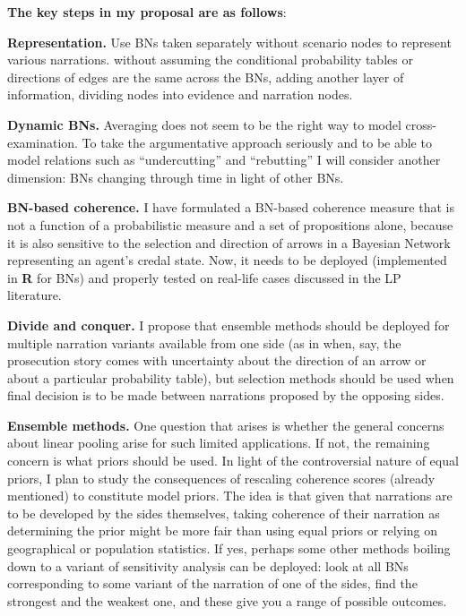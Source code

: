\documentclass[11pt,dvipsnames,enabledeprecatedfontcommands]{scrartcl}
\begin{document}
\vspace{2mm}

\noindent \textbf{The key steps in my proposal are as follows}:

\vspace{1mm}

\noindent
\textbf{Representation.} Use BNs taken separately without scenario nodes
to represent various narrations. without assuming the conditional
probability tables or directions of edges are the same across the BNs,
adding another layer of information, dividing nodes into evidence and
narration nodes.

\noindent \textbf{Dynamic BNs.} Averaging does not seem to be the right
way to model cross-examination. To take the argumentative approach
seriously and to be able to model relations such as ``undercutting'' and
``rebutting'' I will consider another dimension: BNs changing through
time in light of other BNs.

\noindent
 \textbf{BN-based coherence.} I have formulated a BN-based coherence
measure that is not a function of a probabilistic measure and a set of
propositions alone, because it is also sensitive to the selection and
direction of arrows in a Bayesian Network representing an agent's credal
state. Now, it needs to be deployed (implemented in \textbf{\textsf{R}}
for BNs) and properly tested on real-life cases discussed in the LP
literature.

\noindent
 \textbf{Divide and conquer.} I propose that ensemble methods should be
deployed for multiple narration variants available from one side (as in
when, say, the prosecution story comes with uncertainty about the
direction of an arrow or about a particular probability table), but
selection methods should be used when final decision is to be made
between narrations proposed by the opposing sides.

\noindent
\textbf{Ensemble methods.} One question that arises is whether the
general concerns about linear pooling arise for such limited
applications. If not, the remaining concern is what priors should be
used. In light of the controversial nature of equal priors, I plan to
study the consequences of rescaling coherence scores (already mentioned)
to constitute model priors. The idea is that given that narrations are
to be developed by the sides themselves, taking coherence of their
narration as determining the prior might be more fair than using equal
priors or relying on geographical or population statistics. If yes,
perhaps some other methods boiling down to a variant of sensitivity
analysis can be deployed: look at all BNs corresponding to some variant
of the narration of one of the sides, find the strongest and the weakest
one, and these give you a range of possible outcomes.
\end{document}
